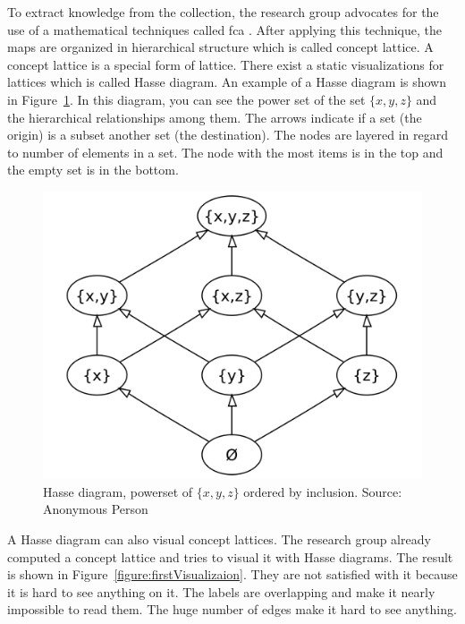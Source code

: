 \documentclass[11pt]{report}
\begin{document}
To extract knowledge from the collection, the research group advocates for the use of a mathematical techniques called \acrlong{fca} \cite{Castellanos,Cigarran}. After applying this technique, the maps are organized in hierarchical structure which is called concept lattice. A concept lattice is a special form of lattice. There exist a static visualizations for lattices which is called Hasse diagram. An example of a Hasse diagram is shown in Figure~\ref{figure:hasse}. In this diagram, you can see the power set of the set $\{x,y,z\}$ and the hierarchical relationships among them. The arrows indicate if a set (the origin) is a subset another set (the destination). The nodes are layered in regard to number of elements in a set. The node with the most items is in the top and the empty set is in the bottom. \\

\begin{figure}[!ht]
	\centering
	\includegraphics[width=\linewidth]{./images/hasse}
\caption{Hasse diagram, powerset of $\{x,y,z\}$ ordered by inclusion. Source: Anonymous Person\cite{hassediagramfig}}
\label{figure:hasse}
\end{figure}

A Hasse diagram can also visual concept lattices. The research group already computed a concept lattice and tries to visual it with Hasse diagrams. The result is shown in Figure~\ref{figure:firstVisualizaion}. They are not satisfied  with it because it is hard to see anything on it. The labels are overlapping and make it nearly impossible to read them. The huge number of edges make it hard to see anything.  \\
\end{document}
